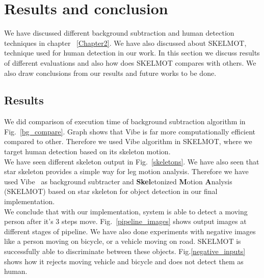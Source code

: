 \chapter{Results and conclusion} %
\label{Chapter4}
\indent We have discussed different background subtraction and human
detection techniques in chapter ~\ref{Chapter2}. We have also discussed
about SKELMOT, technique used for human detection in our work. In this
section we discuss results of different evaluations and also how does
SKELMOT compares with others. We also draw conclusions from our results
and future works to be done.
\section{Results}
\indent We did comparison of execution time of background subtraction
algorithm in Fig.~\ref{bg_compare}. Graph shows that Vibe is far more
computationally efficient compared to other. Therefore we used Vibe
algorithm in SKELMOT, where we target human detection based on its
skeleton motion.\\
We have seen different skeleton
output in Fig.~\ref{skeletons}. We have also seen that star skeleton
provides a simple way for leg motion analysis. Therefore we have used
Vibe~\cite{9} as background subtracter and \textbf{Skel}etonized
\textbf{M}otion \textbf{A}nalysis (SKELMOT) based on star skeleton for
object detection in our final implementation.\\
\indent We conclude that with our implementation, system is able to
detect a moving person after it's 3 steps move.
Fig.~\ref{pipeline_images} shows output images at different stages of
pipeline.
\indent We have also done experiments with negative images like a person
moving on bicycle, or a vehicle moving on road. SKELMOT is successfully able
to discriminate between these objects. Fig.\ref{negative_inputs} shows
how it rejects moving vehicle and bicycle and  does not detect them as
human.

